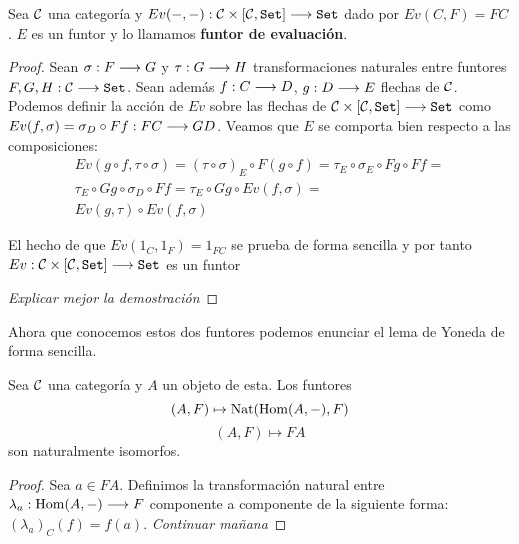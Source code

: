 \begin{proposition*}
  Sea $\mathcal{C}$ una categoría y $Ev(-, -) : \mathcal{C}\times[\mathcal{C}, \texttt{Set}]\longrightarrow \texttt{Set}$
  dado por $Ev(C, F) = FC$. $E$ es un funtor y lo llamamos
  \textbf{funtor de evaluación}.
\end{proposition*}
\begin{proof}
  Sean $\sigma : F\longrightarrow G$ y $\tau : G\longrightarrow H$ transformaciones naturales entre funtores
  $F, G, H : \mathcal{C}\longrightarrow \texttt{Set}$. Sean además $f : C\longrightarrow D$,
  $g : D\longrightarrow E$ flechas de $\mathcal{C}$.
  Podemos definir la acción de $Ev$ sobre las flechas de
  $\mathcal{C}\times[\mathcal{C}, \texttt{Set}]\longrightarrow \texttt{Set}$ como
  $Ev(f, \sigma) = \sigma_D \circ Ff : FC\longrightarrow GD$. Veamos que $E$ se comporta bien
  respecto a las composiciones:
  \begin{multline*}
    Ev(g \circ f, \tau\circ\sigma) =
    (\tau \circ \sigma)_E\circ F(g\circ f) =
    \tau_E\circ\sigma_E\circ Fg \circ Ff = \\
  \tau_E\circ Gg \circ\sigma_D \circ Ff =
  \tau_E\circ Gg \circ Ev(f, \sigma) =\\
  Ev(g, \tau) \circ Ev(f, \sigma)
  \end{multline*}

  El hecho de que $Ev(1_C, 1_F) = 1_{FC}$ se prueba de forma sencilla
  y por tanto $Ev : \mathcal{C}\times[\mathcal{C}, \texttt{Set}]\longrightarrow \texttt{Set}$ es un funtor

  \textit{Explicar mejor la demostración}
\end{proof}

Ahora que conocemos estos dos funtores podemos enunciar el lema
de Yoneda de forma sencilla.

\begin{theorem}
  Sea $\mathcal{C}$ una categoría y $A$ un objeto de esta. Los funtores
  $$(A, F) \mapsto \operatorname{Nat}(\operatorname{Hom}(A, -), F)$$
  $$(A, F) \mapsto FA$$
  son naturalmente isomorfos.
\end{theorem}
\begin{proof}
  Sea $a \in F A$. Definimos la transformación natural entre
  $\lambda_a : \operatorname{Hom}(A, -)\longrightarrow F$ componente a componente de
  la siguiente forma: $(\lambda_a)_C(f) = f(a)$.
  \textit{Continuar mañana}
\end{proof}
